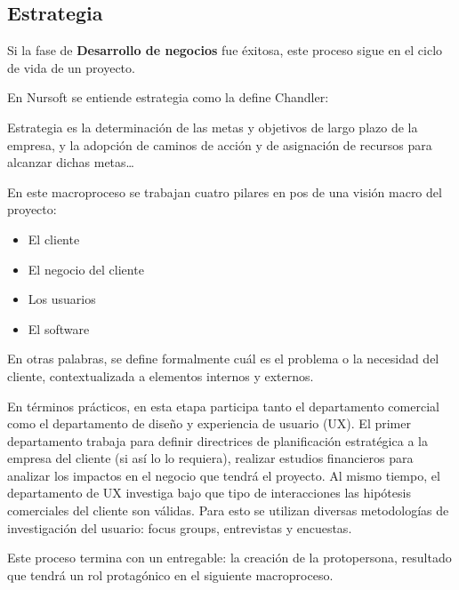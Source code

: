 \subsection{Estrategia}

Si la fase de \textbf{Desarrollo de negocios} fue éxitosa, este proceso sigue en el ciclo de vida de un proyecto.

En Nursoft se entiende estrategia como la define Chandler\cite{chandler_1962}:

\begin{displayquote}
Estrategia es la determinación de las metas y objetivos de largo plazo de la empresa,
y la adopción de caminos de acción y de asignación de recursos para alcanzar dichas metas…
\end{displayquote}

En este macroproceso se trabajan cuatro pilares en pos de una visión macro del proyecto:

\begin{itemize}
    \item El cliente
    \item El negocio del cliente
    \item Los usuarios
    \item El software
\end{itemize}

En otras palabras, se define formalmente cuál es el problema o la necesidad del cliente, contextualizada
a elementos internos y externos.

En términos prácticos, en esta etapa participa tanto el departamento comercial como el departamento de diseño
y experiencia de usuario (UX). El primer departamento trabaja para definir directrices de planificación
estratégica a la empresa del cliente (si así lo lo requiera), realizar estudios financieros
para analizar los impactos en el negocio que tendrá el proyecto. 
Al mismo tiempo, el departamento de UX investiga bajo que tipo de interacciones las hipótesis
comerciales del cliente son válidas. Para esto se utilizan diversas metodologías de
investigación del usuario: focus groups, entrevistas y encuestas. 

Este proceso termina con un entregable: la creación de la protopersona\footnotemark[7],
resultado que tendrá un rol protagónico en el siguiente macroproceso.


